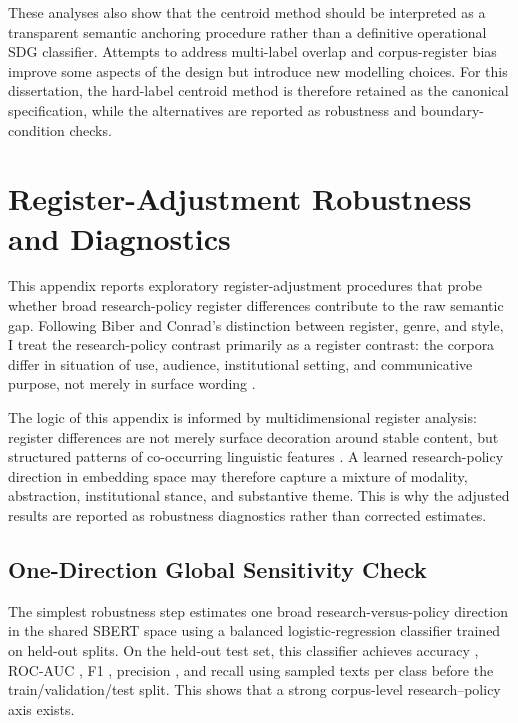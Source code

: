\documentclass[12pt,a4paper]{article}
\begin{document}
These analyses also show that the centroid method should be interpreted as a transparent semantic anchoring procedure rather than a definitive operational SDG classifier. Attempts to address multi-label overlap and corpus-register bias improve some aspects of the design but introduce new modelling choices. For this dissertation, the hard-label centroid method is therefore retained as the canonical specification, while the alternatives are reported as robustness and boundary-condition checks.

\section{Register-Adjustment Robustness and Diagnostics}
\label{app:register-robustness}

This appendix reports exploratory register-adjustment procedures that probe whether broad research-policy register differences contribute to the raw semantic gap. Following Biber and Conrad's distinction between register, genre, and style, I treat the research-policy contrast primarily as a register contrast: the corpora differ in situation of use, audience, institutional setting, and communicative purpose, not merely in surface wording \parencite{biberConrad2009register}.

The logic of this appendix is informed by multidimensional register analysis: register differences are not merely surface decoration around stable content, but structured patterns of co-occurring linguistic features \parencite{biber1988variation}. A learned research-policy direction in embedding space may therefore capture a mixture of modality, abstraction, institutional stance, and substantive theme. This is why the adjusted results are reported as robustness diagnostics rather than corrected estimates.

\subsection{One-Direction Global Sensitivity Check}

The simplest robustness step estimates one broad research-versus-policy direction in the shared SBERT space using a balanced logistic-regression classifier trained on held-out splits. On the held-out test set, this classifier achieves accuracy \RegisterClassifierTestAccuracy{}, ROC-AUC \RegisterClassifierTestRocAuc{}, F1 \RegisterClassifierTestFOne{}, precision \RegisterClassifierTestPrecision{}, and recall \RegisterClassifierTestRecall{} using \RegisterClassifierSamplePerClass{} sampled texts per class before the train/validation/test split. This shows that a strong corpus-level research--policy axis exists.
\end{document}
